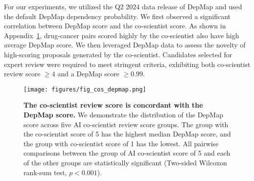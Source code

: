 For our experiments, we utilized the Q2 2024 data release of DepMap and used the default DepMap dependency probability. We first observed a significant correlation between DepMap score and the co-scientist score. As shown in Appendix~\cref{fig:cos_depmap}, drug-cancer pairs scored highly by the co-scientist also have high average DepMap score. We then leveraged DepMap data to assess the novelty of high-scoring proposals generated by the co-scientist. Candidates selected for expert review were required to meet stringent criteria, exhibiting both co-scientist review score $\geq 4$ and a DepMap score $\geq 0.99$.

\begin{figure}[htbp!]
\centering
\texttt{[image: figures/fig\_cos\_depmap.png]}
\vspace{0.1cm}
\caption{\textbf{The co-scientist review score is concordant with the DepMap score.} We demonstrate the distribution of the DepMap score across five AI co-scientist review score groups. The group with the co-scientist score of 5 has the highest median DepMap score, and the group with co-scientist score of 1 has the lowest. All pairwise comparisons between the group of AI co-scientist score of 5 and each of the other groups are statistically significant (Two-sided Wilcoxon rank-sum test, $p < 0.001$).}
\label{fig:cos_depmap}
\end{figure}


